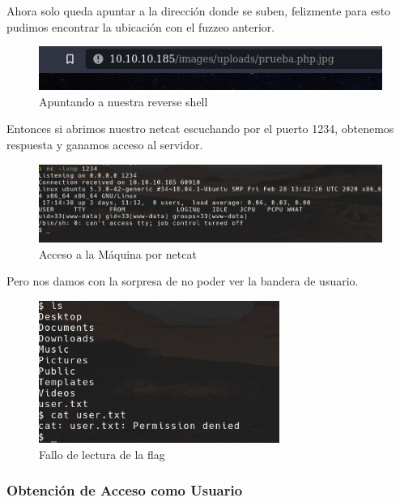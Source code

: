\documentclass{article}
\begin{document}
Ahora solo queda apuntar a la dirección donde se suben, felizmente para esto pudimos encontrar la ubicación con el fuzzeo anterior.


\begin{figure}[h!]
	\center 
	\includegraphics[width=\textwidth]{images/magic/apuntando-reverse1.png}
	\caption{Apuntando a nuestra reverse shell}
\end{figure}


\clearpage

Entonces si abrimos nuestro netcat escuchando por el puerto 1234, obtenemos respuesta y ganamos acceso al servidor.

\begin{figure}[h!]
	\center 
	\includegraphics[width=\textwidth]{images/magic/acceso-maquina.png}
	\caption{Acceso a la Máquina por netcat}
\end{figure}

Pero nos damos con la sorpresa de no poder ver la bandera de usuario.

\begin{figure}[h!]
	\center 
	\includegraphics[width=0.7\textwidth]{images/magic/fallo-lectura-flag.png}
	\caption{Fallo de lectura de la flag}
\end{figure}

\clearpage

\subsubsection{Obtención de Acceso como Usuario}
\end{document}
